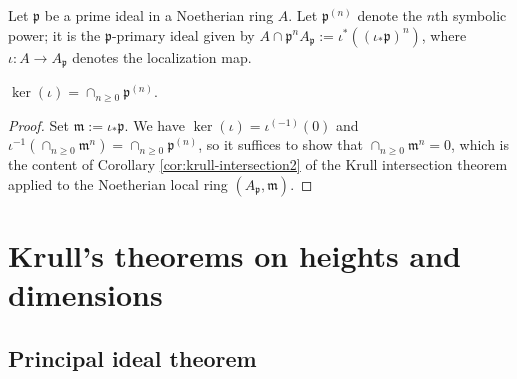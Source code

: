 \documentclass[reqno]{amsart}
\begin{document}
Let \(\mathfrak{p}\) be a prime ideal in a Noetherian ring \(A\).
Let \(\mathfrak{p}^{(n)}\) denote the $n$th symbolic power;
it is the $\mathfrak{p}$-primary ideal
given by \(A \cap \mathfrak{p}^n A_\mathfrak{p} := \iota^*(
  (\iota_* \mathfrak{p} )^n)\),
where \(\iota : A \rightarrow A_\mathfrak{p}\) denotes the
localization map.
\begin{theorem}
  $\ker(\iota) = \cap_{n \geq 0} \mathfrak{p}^{(n)}$.
\end{theorem}
\begin{proof}
  Set $\mathfrak{m} := \iota_* \mathfrak{p}$.  We have
  $\ker(\iota) = \iota^{(-1)}(0)$ and
  $\iota^{-1}(\cap_{n \geq 0} \mathfrak{m}^n) = \cap_{n \geq 0}
  \mathfrak{p}^{(n)}$, so it suffices to show that
  $\cap_{n \geq 0} \mathfrak{m}^n = 0$, which is the content of
  Corollary \ref{cor:krull-intersection2} of the Krull
  intersection theorem applied to the Noetherian local ring
  $(A_\mathfrak{p},\mathfrak{m})$.
\end{proof}


\section{Krull's theorems on heights and dimensions}
\label{sec:orgd3770e5}
\subsection{Principal ideal theorem}
\label{sec:orgb8870ab}
\end{document}
